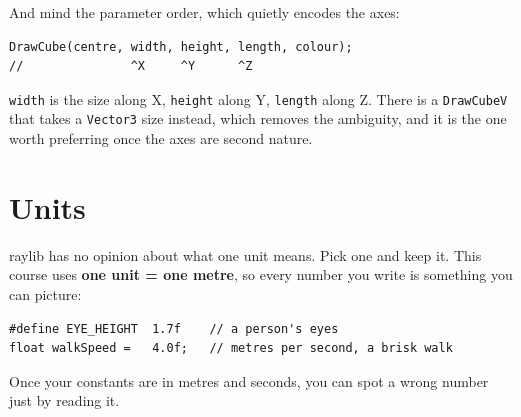 And mind the parameter order, which quietly encodes the axes:

\begin{lstlisting}
DrawCube(centre, width, height, length, colour);
//               ^X     ^Y      ^Z
\end{lstlisting}

\lstinline|width| is the size along X, \lstinline|height| along Y,
\lstinline|length| along Z. There is a \lstinline|DrawCubeV| that takes a
\lstinline|Vector3| size instead, which removes the ambiguity, and it is the one
worth preferring once the axes are second nature.

\section{Units}

raylib has no opinion about what one unit means. Pick one and keep it. This
course uses \textbf{one unit = one metre}, so every number you write is something
you can picture:

\begin{lstlisting}
#define EYE_HEIGHT  1.7f    // a person's eyes
float walkSpeed =   4.0f;   // metres per second, a brisk walk
\end{lstlisting}

Once your constants are in metres and seconds, you can spot a wrong number just
by reading it.

